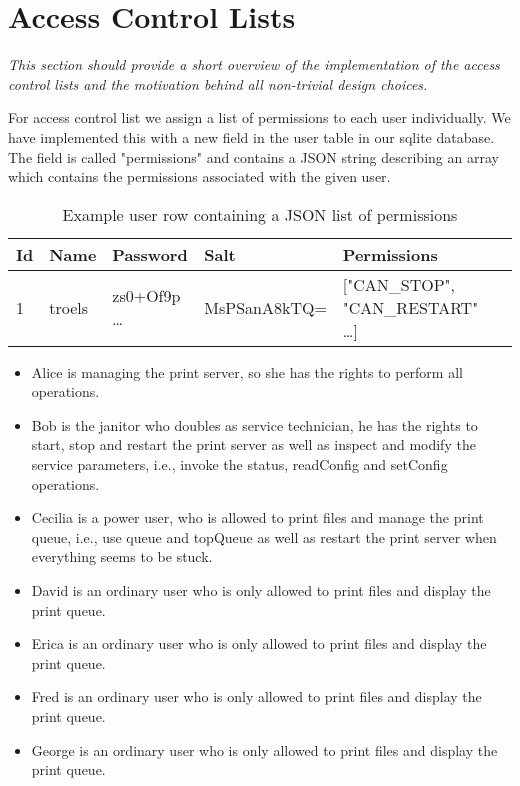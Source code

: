 \documentclass[12pt]{article}
\begin{document}
\newpage

\section{Access Control Lists}
\label{sec:Access Control Lists}

\textit{This section should provide a short overview of the implementation of the access control lists and the motivation behind all non-trivial design choices.}

For access control list we assign a list of permissions to each user individually. We have implemented this with a new field in the user table in our sqlite database. The field is called "permissions" and contains a JSON string describing an array which contains the permissions associated with the given user.

\begin{table}[H]
\centering
\begin{tabular}{|l|l|l|l|l|l|}
\hline
Id & Name & Password & Salt & Permissions \\
\hline
1 & troels & zs0+Of9p \ldots & MsPSanA8kTQ= & ["CAN\_STOP", "CAN\_RESTART" \ldots] \\
\hline
\end{tabular}

\caption{Example user row containing a JSON list of permissions}
\label{json-permissions}
\end{table}

\begin{itemize}
    \item Alice is managing the print server, so she has the rights to perform all operations.
    \item Bob is the janitor who doubles as service technician, he has the rights to start, stop and restart the print server as well as inspect and modify the service parameters, i.e., invoke the status, readConfig and setConfig operations.
    \item Cecilia is a power user, who is allowed to print files and manage the print queue, i.e., use queue and topQueue as well as restart the print server when everything seems to be stuck.
    \item David is an ordinary user who is only allowed to print files and display the print queue.
    \item Erica is an ordinary user who is only allowed to print files and display the print queue.
    \item Fred is an ordinary user who is only allowed to print files and display the print queue.
    \item George is an ordinary user who is only allowed to print files and display the print queue.
\end{itemize}
\end{document}
